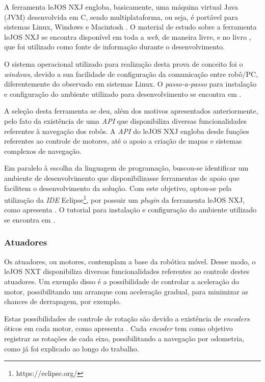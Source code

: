 		A ferramenta leJOS NXJ engloba, basicamente, uma máquina virtual Java (JVM) desenvolvida em C, sendo multiplataforma, ou seja, é portável para sistemas Linux, Windows e Macintosh \cite{legonxj}. O material de estudo sobre a ferramenta leJOS NXJ se encontra disponível em toda a \textit{web}, de maneira livre, e no livro \cite{legonxj}, que foi utilizado como fonte de informação durante o desenvolvimento.	

		O sistema operacional utilizado para realização desta prova de conceito foi o \textit{windows}, devido a sua facilidade de configuração da comunicação entre robô/PC, diferentemente do observado em sistemas Linux. O \textit{passo-a-passo} para instalação e configuração do ambiente utilizado para desenvolvimento se encontra em \cite[p. 6]{legonxj}.

		A seleção desta ferramenta se deu, além dos motivos apresentados anteriormente, pelo fato da existência de uma \textit{API} que disponibiliza diversas funcionalidades referentes à navegação dos robôs. A \textit{API} do leJOS NXJ engloba desde funções referentes ao controle de motores, até o apoio a criação de mapas e sistemas complexos de navegação.

		Em paralelo à escolha da linguagem de programação, buscou-se identificar um ambiente de desenvolvimento que disponibilizasse ferramentas de apoio que facilitem o desenvolvimento da solução. Com este objetivo, optou-se pela utilização da \textit{IDE} Eclipse\footnote{https://eclipse.org/}, por possuir um \textit{plugin} da ferramenta leJOS NXJ, como apresenta \cite{legonxj}. O tutorial para instalação e configuração do ambiente utilizado se encontra em \cite[p. 14]{legonxj}.

	\subsubsection{Atuadores}

		Os atuadores, ou motores, contemplam a base da robótica móvel. Desse modo, o leJOS NXT disponibiliza diversas funcionalidades referentes ao controle destes atuadores. Um exemplo disso é a possibilidade de controlar a aceleração do motor, possibilitando um arranque com aceleração gradual, para minimizar as chances de derrapagem, por exemplo.

		Estas possibilidades de controle de rotação são devido a existência de \textit{encoders} óticos em cada motor, como apresenta \cite{legonxj}. Cada \textit{encoder} tem como objetivo registrar as rotações de cada eixo, possibilitando a navegação por odometria, como já foi explicado ao longo do trabalho.

